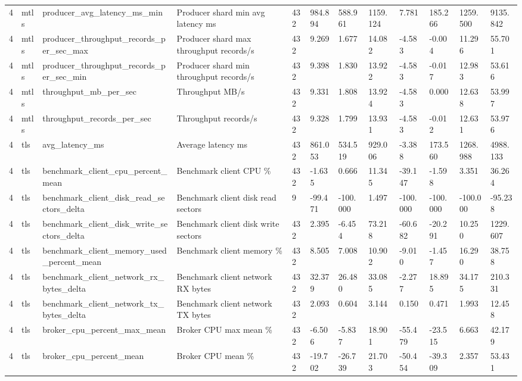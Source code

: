 \begin{longtable}{llllllllllll}
4 & mtls & producer\_avg\_latency\_ms\_min & Producer shard min avg latency ms & 432 & 984.894 & 588.961 & 1159.124 & 7.781 & 185.266 & 1259.500 & 9135.842 \\
4 & mtls & producer\_throughput\_records\_per\_sec\_max & Producer shard max throughput records/s & 432 & 9.269 & 1.677 & 14.082 & -4.583 & -0.004 & 11.296 & 55.701 \\
4 & mtls & producer\_throughput\_records\_per\_sec\_min & Producer shard min throughput records/s & 432 & 9.398 & 1.830 & 13.922 & -4.583 & -0.017 & 12.983 & 53.616 \\
4 & mtls & throughput\_mb\_per\_sec & Throughput MB/s & 432 & 9.331 & 1.808 & 13.924 & -4.583 & 0.000 & 12.638 & 53.997 \\
4 & mtls & throughput\_records\_per\_sec & Throughput records/s & 432 & 9.328 & 1.799 & 13.931 & -4.583 & -0.012 & 12.631 & 53.976 \\
4 & tls & avg\_latency\_ms & Average latency ms & 432 & 861.053 & 534.519 & 929.006 & -3.388 & 173.560 & 1268.988 & 4988.133 \\
4 & tls & benchmark\_client\_cpu\_percent\_mean & Benchmark client CPU \% & 432 & -1.635 & 0.666 & 11.345 & -39.147 & -1.598 & 3.351 & 36.264 \\
4 & tls & benchmark\_client\_disk\_read\_sectors\_delta & Benchmark client disk read sectors & 9 & -99.471 & -100.000 & 1.497 & -100.000 & -100.000 & -100.000 & -95.238 \\
4 & tls & benchmark\_client\_disk\_write\_sectors\_delta & Benchmark client disk write sectors & 432 & 2.395 & -6.454 & 73.218 & -60.682 & -20.291 & 10.250 & 1229.607 \\
4 & tls & benchmark\_client\_memory\_used\_percent\_mean & Benchmark client memory \% & 432 & 8.505 & 7.008 & 10.902 & -9.010 & -1.457 & 16.290 & 38.758 \\
4 & tls & benchmark\_client\_network\_rx\_bytes\_delta & Benchmark client network RX bytes & 432 & 32.379 & 26.480 & 33.085 & -2.277 & 18.895 & 34.175 & 210.331 \\
4 & tls & benchmark\_client\_network\_tx\_bytes\_delta & Benchmark client network TX bytes & 432 & 2.093 & 0.604 & 3.144 & 0.150 & 0.471 & 1.993 & 12.458 \\
4 & tls & broker\_cpu\_percent\_max\_mean & Broker CPU max mean \% & 432 & -6.506 & -5.837 & 18.901 & -55.479 & -23.515 & 6.663 & 42.179 \\
4 & tls & broker\_cpu\_percent\_mean & Broker CPU mean \% & 432 & -19.702 & -26.739 & 21.703 & -50.454 & -39.309 & 2.357 & 53.431 \\

\end{longtable}

